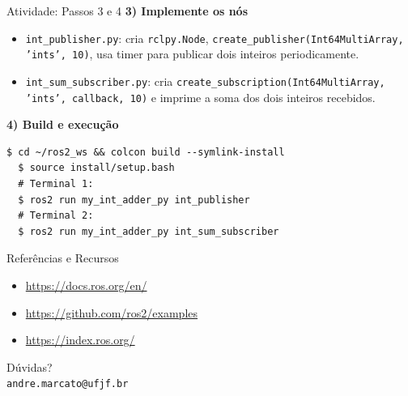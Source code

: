   \begin{frame}[fragile]{Atividade: Passos 3 e 4}
    \textbf{3) Implemente os nós}
    \begin{itemize}
      \item \texttt{int\_publisher.py}: cria \texttt{rclpy.Node}, \texttt{create\_publisher(Int64MultiArray, 'ints', 10)}, usa timer para publicar dois inteiros periodicamente.
      \item \texttt{int\_sum\_subscriber.py}: cria \texttt{create\_subscription(Int64MultiArray, 'ints', callback, 10)} e imprime a soma dos dois inteiros recebidos.
    \end{itemize}
  
    \vspace{0.5em}
    \textbf{4) Build e execução}
    \begin{lstlisting}[style=bashstyle]
  $ cd ~/ros2_ws && colcon build --symlink-install
  $ source install/setup.bash
  # Terminal 1:
  $ ros2 run my_int_adder_py int_publisher
  # Terminal 2:
  $ ros2 run my_int_adder_py int_sum_subscriber
    \end{lstlisting}
  \end{frame}
  
  
\AtBeginSection[]{}

\begin{frame}{Referências e Recursos}
\begin{itemize}
  \item \url{https://docs.ros.org/en/}
  \item \url{https://github.com/ros2/examples}
  \item \url{https://index.ros.org/}
\end{itemize}
\end{frame}

\begin{frame}
\centering
\Large Dúvidas? \\
\bigskip
\small \texttt{andre.marcato@ufjf.br}
\end{frame}


